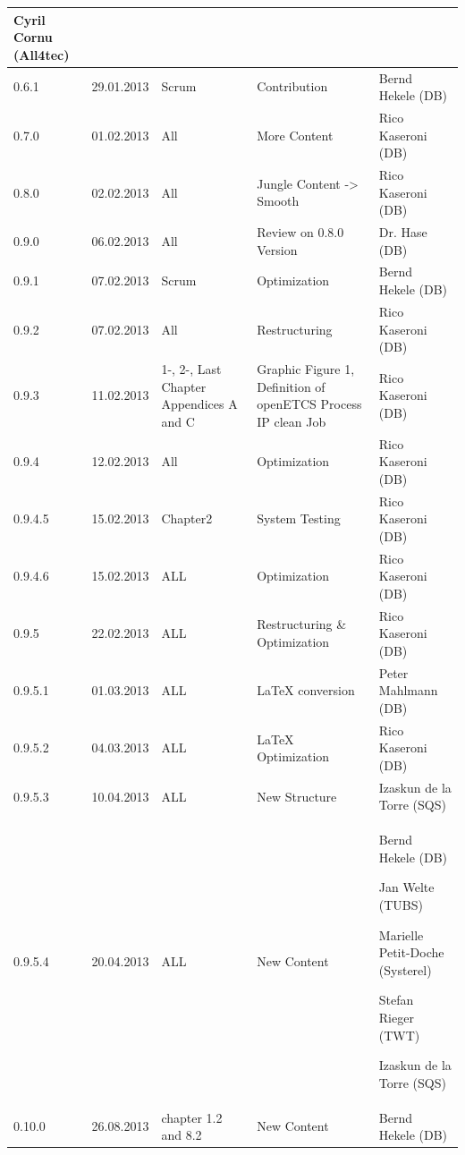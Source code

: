 \documentclass{template/openetcs_article}
\begin{document}
\begin{center}
\begin{longtable}{m{1.1cm}m{1.8cm}m{2cm}m{5cm}m{4cm}}
Cyril Cornu (All4tec)\\\hline
0.6.1 &
29.01.2013 &
Scrum &
Contribution &
Bernd Hekele (DB)\\\hline
0.7.0 &
01.02.2013 &
All &
More Content &
Rico Kaseroni (DB)\\\hline
0.8.0 &
02.02.2013 &
All &
Jungle Content -{\textgreater} Smooth &
Rico Kaseroni (DB)\\\hline
0.9.0 &
06.02.2013 &
All &
Review on 0.8.0 Version &
Dr. Hase (DB)\\\hline
0.9.1 &
07.02.2013 &
Scrum &
Optimization &
Bernd Hekele (DB)\\\hline
0.9.2 &
07.02.2013 &
All &
Restructuring  &
Rico Kaseroni (DB)\\\hline
0.9.3 &
11.02.2013 &
1-, 2-, Last Chapter Appendices A and C  &
Graphic Figure 1, Definition of openETCS Process \gls{IP} clean Job &
Rico Kaseroni (DB)\\\hline
0.9.4 &
12.02.2013 &
All &
Optimization  &
Rico Kaseroni (DB)\\\hline
0.9.4.5 &
15.02.2013 &
Chapter2 &
System Testing &
Rico Kaseroni (DB)\\\hline
0.9.4.6 &
15.02.2013 &
ALL &
Optimization  &
Rico Kaseroni (DB)\\\hline
0.9.5 &
22.02.2013 &
ALL &
Restructuring \& Optimization  &
Rico Kaseroni (DB)\\\hline
0.9.5.1 &
01.03.2013 &
ALL &
LaTeX conversion &
Peter Mahlmann (DB)\\\hline
0.9.5.2 &
04.03.2013 &
ALL &
LaTeX Optimization &
Rico Kaseroni (DB)\\\hline
0.9.5.3 &
10.04.2013 &
ALL &
New Structure  &
Izaskun de la Torre (SQS)\\\hline
0.9.5.4 &
20.04.2013 &
ALL &
New Content  &
Bernd Hekele (DB)

Jan Welte (TUBS)

Marielle Petit-Doche (Systerel)

Stefan Rieger (TWT)

Izaskun de la Torre (SQS)\\\hline
0.10.0 &
26.08.2013 &
chapter 1.2 and 8.2 &
New Content  &
Bernd Hekele (DB)


\end{longtable}
\end{center}
\end{document}
